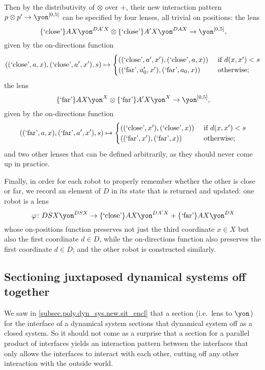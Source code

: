 \documentclass[Book-Poly]{subfiles}
\begin{document}
\begin{exercise}
\begin{solution}
\begin{enumerate}
    Then by the distributivity of $\otimes$ over $+$, their new interaction pattern $p\otimes p'\to\yon^{[0,5]}$ can be specified by four lenses, all trivial on positions: the lens
    \[
        \{\text{`close'}\}AX\yon^{DA'X}\otimes\{\text{`close'}\}A'X\yon^{DAX}\to\yon^{[0,5]},
    \]
    given by the on-directions function
    \[
        ((\text{`close'},a,x),(\text{`close'},a',x'),s)\mapsto
          \begin{cases}
          	((\text{`close'},a',x'),(\text{`close'},a,x))&\textnormal{ if }d(x,x')<s\\
          	((\text{`far'},a'_0,x'),(\text{`far'},a_0,x))&\textnormal{ otherwise};
          \end{cases}
    \]
    the lens
    \[
        \{\text{`far'}\}AX\yon^X\otimes\{\text{`far'}\}A'X\yon^X\to\yon^{[0,5]},
    \]
    given by the on-directions function
    \[
        ((\text{`far'},a,x),(\text{`far'},a',x'),s)\mapsto
          \begin{cases}
          	((\text{`close'},x'),(\text{`close'},x))&\textnormal{ if }d(x,x')<s\\
          	((\text{`far'},x'),(\text{`far'},x))&\textnormal{ otherwise};
          \end{cases}
    \]
    and two other lenses that can be defined arbitrarily, as they should never come up in practice.

    Finally, in order for each robot to properly remember whether the other is close or far, we record an element of $D$ in its state that is returned and updated: one robot is a lens
    \[
        \varphi\colon DSX\yon^{DSX}\to \{\text{`close'}\}AX\yon^{DA'X}+\{\text{`far'}\}AX\yon^{DX}
    \]
    whose on-positions function preserves not just the third coordinate $x\in X$ but also the first coordinate $d\in D$, while the on-directions function also preserves the first coordinate $d\in D$; and the other robot is constructed similarly.
\end{enumerate}
\end{solution}
\end{exercise}

\subsection{Sectioning juxtaposed dynamical systems off together}

We saw in \cref{subsec.poly.dyn_sys.new.sit_encl} that a section (i.e.\ lens to $\yon$) for the interface of a dynamical system sections that dynamical system off as a closed system.
So it should not come as a surprise that a section for a parallel product of interfaces yields an interaction pattern between the interfaces that only allows the interfaces to interact with each other, cutting off any other interaction with the outside world.
\end{document}
